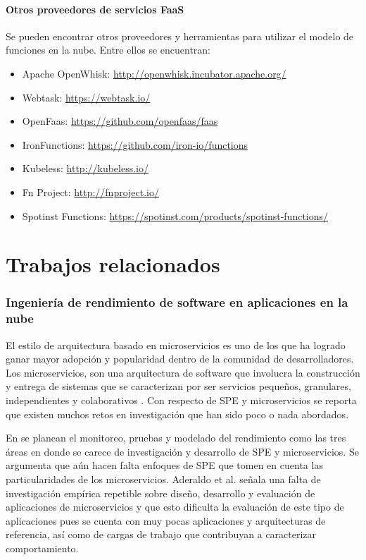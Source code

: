\paragraph{Otros proveedores de servicios FaaS} Se pueden encontrar otros proveedores y herramientas para utilizar el modelo de funciones en la nube. Entre ellos se encuentran:
\begin{itemize}
    \item Apache OpenWhisk: \url{http://openwhisk.incubator.apache.org/}
    \item Webtask: \url{https://webtask.io/}
    \item OpenFaas: \url{https://github.com/openfaas/faas}
    \item IronFunctions: \url{https://github.com/iron-io/functions}
    \item Kubeless: \url{http://kubeless.io/}
    \item Fn Project: \url{http://fnproject.io/}
    \item Spotinst Functions: \url{https://spotinst.com/products/spotinst-functions/}
\end{itemize}

\newpage

\section{Trabajos relacionados}

\subsubsection{Ingeniería de rendimiento de software en aplicaciones en la nube}

El estilo de arquitectura basado en microservicios es uno de los que ha logrado ganar mayor adopción y popularidad dentro de la comunidad de desarrolladores. Los microservicios, son una arquitectura de software que involucra la construcción y entrega de sistemas que se caracterizan por ser servicios pequeños, granulares, independientes y colaborativos \cite{10.1007/978-3-319-62636-9_11}. Con respecto de SPE y microservicios se reporta que existen muchos retos en investigación que han sido poco o nada abordados. 

En \cite{Heinrich:2017:PEM:3053600.3053653} se planean el monitoreo, pruebas y modelado del rendimiento como las tres áreas en donde se carece de investigación y desarrollo de SPE y microservicios. Se argumenta que aún hacen falta enfoques de SPE que tomen en cuenta las particularidades de los microservicios. Aderaldo et al.\cite{7968049} señala una falta de investigación empírica repetible sobre diseño, desarrollo y evaluación de aplicaciones de microservicios y que esto dificulta la evaluación de este tipo de aplicaciones pues se cuenta con muy pocas aplicaciones y arquitecturas de referencia, así como de cargas de trabajo que contribuyan a caracterizar comportamiento.

